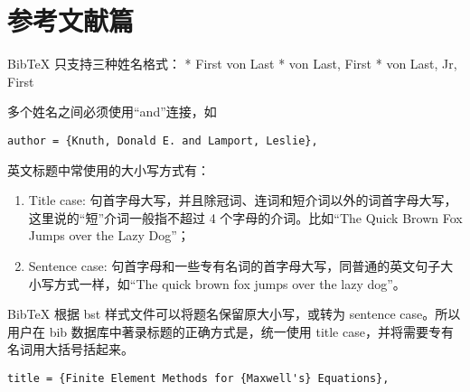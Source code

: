%
%
%
%

\section{参考文献篇}





BibTeX 只支持三种姓名格式： * First von Last * von Last, First * von
Last, Jr, First

多个姓名之间必须使用``and''连接，如

\begin{verbatim}
author = {Knuth, Donald E. and Lamport, Leslie},
\end{verbatim}





英文标题中常使用的大小写方式有：

\begin{enumerate}
\def\labelenumi{\arabic{enumi}.}

\item
  Title case:
  句首字母大写，并且除冠词、连词和短介词以外的词首字母大写，这里说的``短''介词一般指不超过
  4 个字母的介词。比如``The Quick Brown Fox Jumps over the Lazy Dog''；
\item
  Sentence case:
  句首字母和一些专有名词的首字母大写，同普通的英文句子大小写方式一样，如``The
  quick brown fox jumps over the lazy dog''。
\end{enumerate}

BibTeX 根据 bst 样式文件可以将题名保留原大小写，或转为 sentence
case。所以用户在 bib 数据库中著录标题的正确方式是，统一使用 title
case，并将需要专有名词用大括号括起来。

\begin{verbatim}
title = {Finite Element Methods for {Maxwell's} Equations},
\end{verbatim}

